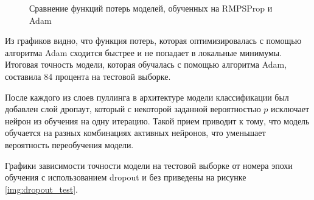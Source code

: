 \begin{figure}[H]
	\begin{center}
		\caption{Сравнение функций потерь моделей, обученных на RMPSProp и Adam}
		\label{img:adam_rmsprops_test}
	\end{center}
\end{figure}

Из графиков видно, что функция потерь, которая оптимизировалась с помощью алгоритма Adam сходится быстрее и не попадает в локальные минимумы. Итоговая точность модели, которая обучалась с помощью алгоритма Adam, составила 84 процента на тестовой выборке.


После каждого из слоев пуллинга в архитектуре модели классификации был добавлен слой дропаут, который с некоторой заданной вероятностью $p$ исключает нейрон из обучения на одну итерацию. Такой прием приводит к тому, что модель обучается на разных комбинациях активных нейронов, что уменьшает вероятность переобучения модели.

Графики зависимости точности модели на тестовой выборке от номера эпохи обучения с использованием dropout и без приведены на рисунке \ref{img:dropout_test}.

